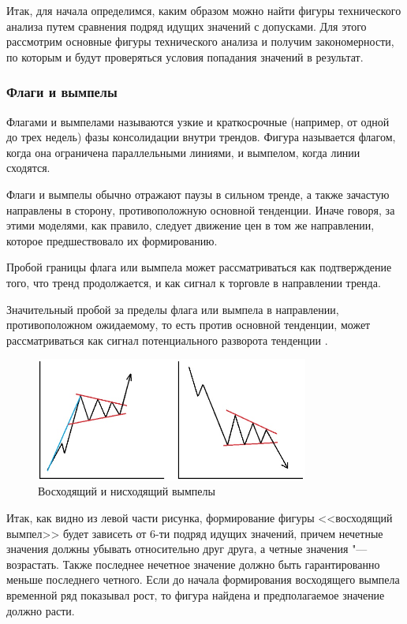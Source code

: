 \documentclass[bachelor, och, coursework]{SCWorks}
\begin{document}
    
    Итак, для начала определимся, каким образом можно найти фигуры технического
    анализа путем сравнения подряд идущих значений с допусками. Для этого
    рассмотрим основные фигуры технического анализа и получим закономерности, по
    которым и будут проверяться условия попадания значений в результат.
    
        \subsubsection{Флаги и вымпелы}

        Флагами и вымпелами называются узкие и краткосрочные (например, от одной
        до трех недель) фазы консолидации внутри трендов. Фигура называется
        флагом, когда она ограничена параллельными линиями, и вымпелом, когда
        линии сходятся. 

        Флаги и вымпелы обычно отражают паузы в сильном тренде, а также зачастую
        направлены в сторону, противоположную основной тенденции. Иначе говоря,
        за этими моделями, как правило, следует движение цен в том же
        направлении, которое предшествовало их формированию.

        Пробой границы флага или вымпела может рассматриваться как подтверждение
        того, что тренд продолжается, и как сигнал к торговле в направлении
        тренда. 

        Значительный пробой за пределы флага или вымпела в направлении,
        противоположном ожидаемому, то есть против основной тенденции, может
        рассматриваться как сигнал потенциального разворота тенденции
        \cite{schwager1995technical}. 

    \begin{figure}[H]
        \centering
        \includegraphics[width=0.8\textwidth]{pic/pennants.jpg}
        \caption{Восходящий и нисходящий вымпелы}
    \end{figure}

    Итак, как видно из левой части рисунка, формирование фигуры <<восходящий
    вымпел>> будет зависеть от 6-ти подряд идущих значений, причем нечетные
    значения должны убывать относительно друг друга, а четные значения "---
    возрастать. Также последнее нечетное значение должно быть гарантированно
    меньше последнего четного. Если до начала формирования восходящего вымпела
    временной ряд показывал рост, то фигура найдена и предполагаемое значение
    должно расти.
\end{document}
